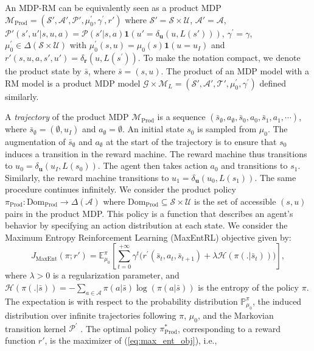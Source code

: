 \documentclass[letterpaper, 10 pt, conference]{ieeeconf}
\begin{document}
An MDP-RM can be equivalently seen as a product MDP $\mathcal{M}_\mathrm{Prod} = (\mathcal{S}', \mathcal{A}', \mathcal{P}', \mu_0^\prime, \gamma^\prime, r')$ where $\mathcal{S}' = \mathcal{S}\times \mathcal{U}$, $\mathcal{A}' = \mathcal{A}$, $\mathcal{P}'(s',u'| s,u,a) = \mathcal{P}(s'|s,a) \mathbf{1}(u' = \delta_\textbf{u}(u,L(s')))$, $\gamma^\prime = \gamma$, $\mu_0^\prime \in \Delta(\mathcal{S}\times \mathcal{U})$ with $\mu_0^\prime(s,u) = \mu_0(s)\mathbf{1}(u = u_I)$ and $r'(s,u,a,s',u') = \delta_\mathbf{r}(u,L(s^\prime))$. To make the notation compact, we denote the product state by $\bar s$, where $\bar s = (s,u)$. The product of an MDP model with a RM model is a product MDP model $\mathcal{G} \times \mathcal{M}_L = (\mathcal{S}', \mathcal{A}', \mathcal{T}', \mu_0^\prime, \gamma^\prime)$ defined similarly.

{A \emph{trajectory} of the product MDP $\mathcal{M}_\mathrm{Prod}$ is a sequence $(\bar s_{\emptyset}, a_{\emptyset}, \bar s_0, a_0, \bar s_1, a_1,\cdots)$, where $\bar s_{\emptyset} = (\emptyset, u_I)$ and $a_{\emptyset}= \emptyset$. An initial state $s_0$ is sampled from $\mu_0$. The augmentation of $\bar s_{\emptyset}$ and $a_\emptyset$ at the start of the trajectory is to ensure that $s_0$ induces a transition in the reward machine. The reward machine thus transitions to $u_0 = \delta_\textbf{u}(u_I, L(s_0))$. The agent then takes action $a_0$ and transitions to $s_1$. Similarly, the reward machine transitions to $u_1 = \delta_\textbf{u}(u_0, L(s_1))$. The same procedure continues infinitely. }We consider the product policy $\pi_{\mathrm{Prod}}:\mathrm{Dom_{Prod}} \to \Delta(\mathcal{A})$ where $\mathrm{Dom_{Prod}}\subseteq \mathcal{S}\times\mathcal{U}$ is the set of accessible $(s,u)$ pairs in the product MDP. This policy is a function that describes an agent’s behavior by specifying an action distribution at each state.  We consider the Maximum Entropy Reinforcement Learning (MaxEntRL) objective given by:
\begin{equation}\label{eq:max_ent_obj}
    J_{\mathrm{MaxEnt}}(\pi;r') = \mathbb{E}^{\pi}_{\mu_0}[\sum\limits_{t=0}^{+\infty} \gamma^t \biggl(  r^\prime (\bar s_t,a_t, \bar s_{t+1}) + \lambda \mathcal{H}(\pi(.|\bar s_t)) \biggr)],
\end{equation}
where $\lambda > 0$ is a regularization parameter, and $\mathcal{H}(\pi(.|\bar{s})) = -\sum\limits_{a\in \mathcal{A}} \pi(a|\bar{s})\log(\pi(a|\bar{s}))$ is the entropy of the policy $\pi$. The expectation is with respect to the probability distribution $\mathbb{P}^\pi_{\mu_0}$, the induced distribution over infinite trajectories following $\pi$, $\mu_0$, and the Markovian transition kernel $\mathcal{P}^\prime$ \cite{ziebart2008maximum}. The optimal policy $\pi_{\mathrm{Prod}}^*$, corresponding to a reward function $r'$, is the maximizer of (\ref{eq:max_ent_obj}), i.e.,
\end{document}
